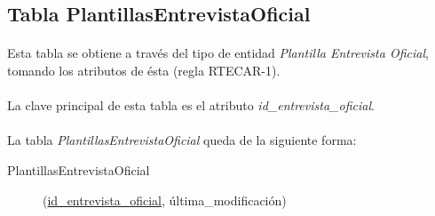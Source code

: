    \subsection{Tabla PlantillasEntrevistaOficial}

      \paragraph{}Esta tabla se obtiene a través del tipo de entidad
      \textit{Plantilla Entrevista Oficial}, tomando los atributos de ésta
      (regla RTECAR-1).

      \paragraph{}La clave principal de esta tabla es el atributo
      \textit{id\_entrevista\_oficial}.

      \paragraph{}La tabla \textit{PlantillasEntrevistaOficial} queda de la
      siguiente forma:

      \begin{description}
         \item[PlantillasEntrevistaOficial] \begin{flushleft}(\underline{id\_entrevista\_oficial}, última\_modificación)\end{flushleft}
      \end{description}
